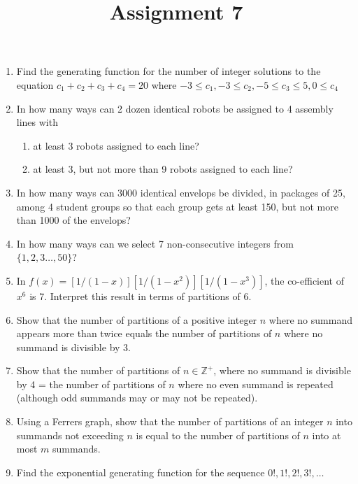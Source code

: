 \documentclass[a4paper]{article}
\title{Assignment 7}
\begin{document}
\maketitle
\begin{enumerate}



\item Find the generating function for the number of integer solutions to the equation $c_1+c_2+c_3+c_4=20$ where $-3\leq c_1, -3 \leq c_2, -5 \leq c_3 \leq 5,0\leq c_4$

\item In how many ways can 2 dozen identical robots be assigned to 4 assembly lines with 
	\begin{enumerate} \item at least 3 robots assigned to each line?  \item at least 3, but not more than 9 robots assigned to each line?  \end{enumerate}
\item In how many ways can 3000 identical envelops be divided, in packages of 25, among 4 student groups so that each group gets at least 150, but not more than 1000 of the envelops?

\item In how many ways can we select 7 non-consecutive integers from $\{1,2,3\dots , 50\}$? 
\item In $f(x)=[1/(1-x)][1/(1-x^2)][1/(1-x^3)]$, the co-efficient of $x^6$ is 7. Interpret this result in terms of partitions of 6. 

\item Show that the number of partitions of a positive integer $n$ where no summand appears more than twice equals the number of partitions of $n$ where no summand is divisible by 3.

\item Show that the number of partitions of $n\in\mathbb{Z}^+$, where no summand is divisible by 4 = the number of partitions of $n$ where no even summand is repeated (although odd summands may or may not be repeated).

\item Using a Ferrers graph, show that the number of partitions of an integer $n$ into summands not exceeding $n$ is equal to the number of partitions of $n$ into at most $m$ summands.

\item Find the exponential generating function for the sequence $0!, 1!, 2!,3!,\dots$



	

\end{enumerate}
\end{document}
